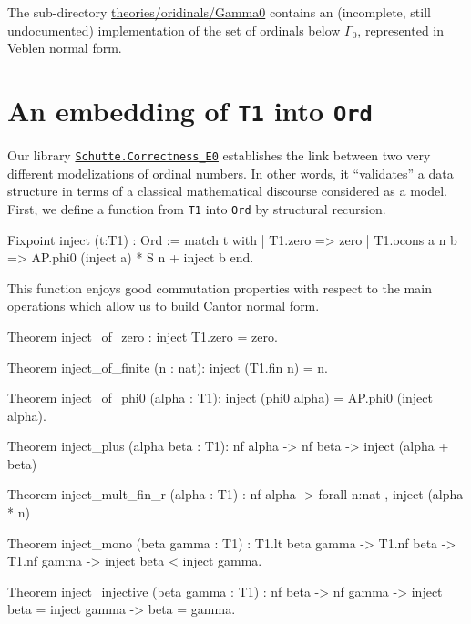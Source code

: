 {\begin{remark}
The sub-directory
    \href{https://github.com/coq-community/hydra-battles/tree/master/theories/ordinals/Gamma0}{theories/oridinals/Gamma0} contains an (incomplete, still undocumented) implementation of the set of ordinals below $\Gamma_0$, represented in Veblen normal form. 
\end{remark}

\section{An embedding of \texttt{T1} into \texttt{Ord}}


Our library 
\href{../theories/html/hydras.Schutte.Correctness_E0.html}%
{\texttt{Schutte.Correctness\_E0}} establishes the link between two very different modelizations of ordinal numbers. In other words, it ``validates'' a data structure in terms of
a classical mathematical discourse considered as a model. 
First, we define a function from \texttt{T1} into  \texttt{Ord} by structural recursion.

\begin{Coqsrc}
Fixpoint inject (t:T1) : Ord :=
 match t with 
     | T1.zero => zero
     | T1.ocons a n b =>  AP.phi0 (inject a) * S n + inject b
 end.  
\end{Coqsrc}

This function enjoys good commutation properties with respect to the main operations which
allow us to build Cantor normal form.

\begin{Coqsrc}
Theorem inject_of_zero : inject T1.zero = zero.

Theorem inject_of_finite (n : nat):
  inject (T1.fin n) =  n.

Theorem inject_of_phi0 (alpha : T1):
  inject (phi0 alpha) = AP.phi0 (inject alpha).

Theorem inject_plus (alpha beta : T1): nf alpha -> nf beta ->
  inject (alpha + beta)%

Theorem inject_mult_fin_r (alpha : T1)  :
  nf alpha -> forall n:nat , inject (alpha *  n)%

Theorem inject_mono (beta gamma : T1) :
  T1.lt  beta gamma -> 
  T1.nf beta -> T1.nf gamma -> 
  inject beta < inject gamma.

Theorem inject_injective (beta gamma : T1) : nf beta -> nf gamma ->
  inject beta = inject gamma -> beta = gamma.
\end{Coqsrc}

}

